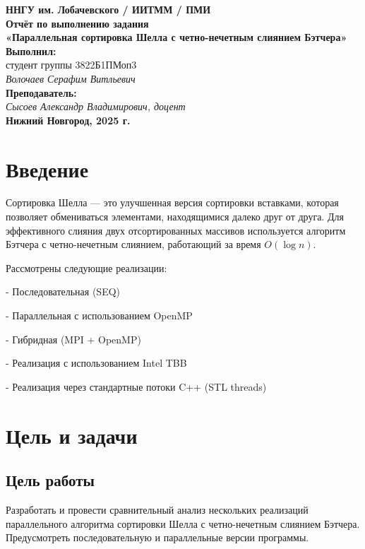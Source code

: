 \documentclass[12pt]{article}
\begin{document}
\begin{titlepage}
    \begin{center}
        \large 
        \textbf{ННГУ им. Лобачевского / ИИТММ / ПМИ}\\[0.5cm]
        \vspace{4cm}
        \textbf{\Large Отчёт по выполнению задания}\\
        \textbf{\large «Параллельная сортировка Шелла с четно-нечетным слиянием Бэтчера»}\\[3cm]
        \vspace{3cm}
        \textbf{Выполнил:}\\
        студент группы 3822Б1ПМоп3 \\
        \textit{Волочаев Серафим Витльевич}\\[1cm]
        \textbf{Преподаватель:}\\
        \textit{Сысоев Александр Владимирович, доцент}\\[2cm]
        \vfill
        \textbf{Нижний Новгород, 2025 г.}
    \end{center}
\end{titlepage}

\tableofcontents
\newpage

\section{Введение}
Сортировка Шелла — это улучшенная версия сортировки вставками, которая позволяет обмениваться элементами, находящимися далеко друг от друга. Для эффективного слияния двух отсортированных массивов используется алгоритм Бэтчера с четно-нечетным слиянием, работающий за время $O(\log n)$.

Рассмотрены следующие реализации:

    
- Последовательная (SEQ)
    
- Параллельная с использованием OpenMP
    
- Гибридная (MPI + OpenMP)
    
- Реализация с использованием Intel TBB
    
- Реализация через стандартные потоки C++ (STL threads)


\section{Цель и задачи}
\subsection*{Цель работы}
Разработать и провести сравнительный анализ нескольких реализаций параллельного алгоритма сортировки Шелла с четно-нечетным слиянием Бэтчера. Предусмотреть последовательную и параллельные версии программы.
\end{document}
